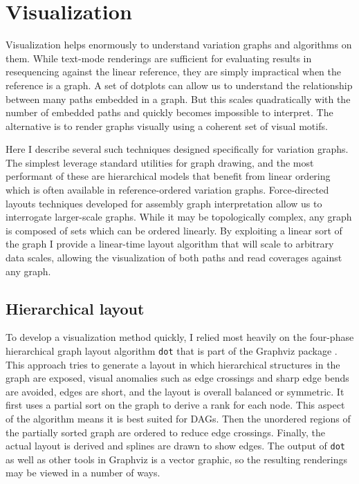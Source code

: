 \section{Visualization}

Visualization helps enormously to understand variation graphs and algorithms on them.
While text-mode renderings are sufficient for evaluating results in resequencing against the linear reference, they are simply impractical when the reference is a graph.
A set of dotplots can allow us to understand the relationship between many paths embedded in a graph.
But this scales quadratically with the number of embedded paths and quickly becomes impossible to interpret.
The alternative is to render graphs visually using a coherent set of visual motifs.

Here I describe several such techniques designed specifically for variation graphs.
The simplest leverage standard utilities for graph drawing, and the most performant of these are hierarchical models that benefit from linear ordering which is often available in reference-ordered variation graphs.
Force-directed layouts techniques developed for assembly graph interpretation allow us to interrogate larger-scale graphs.
While it may be topologically complex, any graph is composed of sets which can be ordered linearly.
By exploiting a linear sort of the graph I provide a linear-time layout algorithm that will scale to arbitrary data scales, allowing the visualization of both paths and read coverages against any graph.

\subsection{Hierarchical layout}

To develop a visualization method quickly, I relied most heavily on the four-phase hierarchical graph layout algorithm {\tt dot} \cite{gansner1993technique} that is part of the Graphviz package \cite{gansner2000open,ellson2001graphviz}.
This approach tries to generate a layout in which hierarchical structures in the graph are exposed, visual anomalies such as edge crossings and sharp edge bends are avoided, edges are short, and the layout is overall balanced or symmetric.
It first uses a partial sort on the graph to derive a rank for each node.
This aspect of the algorithm means it is best suited for DAGs.
Then the unordered regions of the partially sorted graph are ordered to reduce edge crossings.
Finally, the actual layout is derived and splines are drawn to show edges.
The output of {\tt dot} as well as other tools in Graphviz is a vector graphic, so the resulting renderings may be viewed in a number of ways.

